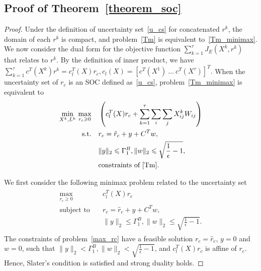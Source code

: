 \documentclass[10pt,twocolumn,twoside,english]{IEEEtran}
\begin{document}
\subsection{Proof of Theorem~\ref{theorem_soc}}
\label{appendix_soc}
\begin{proof}
Under the definition of uncertainty set~\eqref{u_cs} for concatenated $r^k$, the domain of each $r^k$ is compact, and problem~\eqref{Tm} is equivalent to~\eqref{Tm_minimax}. We now consider the dual form for the objective function $\sum\limits_{k=1}^{\tau}J_E(X^k, r^k)$ that relates to $r^k$. By the definition of inner product, we have
$\sum_{k=1}^{\tau}c^T(X^k) r^k = c^T_l (X) r_c,  c_l(X)=[c^T(X^1)\ \dots\ c^T(X^\tau)]^T.$
When the uncertainty set of $r_c$ is an SOC defined as~\eqref{u_cs}, problem~\eqref{Tm_minimax} is equivalent to
\begin{align}
\begin{split}
\underset{X^k, L^k}{\text{min}}\ \underset{r_c \geqslant 0}{\text{max}} \quad&\left(c_l^T(X) r_c + \sum_{k=1}^{\tau}\sum_{i} \sum_{j}X^k_{ij} W_{ij}\right)\\
\text{s.t.}\quad & r_c= \hat{r}_c +y+C^Tw,\\
                                     &\|y\|_2 \leqslant \Gamma_1^B, \|w\|_2 \leqslant \sqrt{\frac{1}{\epsilon}-1},\\
\quad&\text{constraints of~\eqref{Tm}.}
\end{split}
\label{max_rc}
\end{align}


We first consider the following minimax problem related to the uncertainty set 
\begin{align}
\begin{split}
\underset{r_c \geqslant 0}{\text{max}} \quad&c_l^T(X) r_c\\
\text{subject to}\quad & r_c= \hat{r}_c +y+C^Tw,\\
&\|y\|_2 \leqslant \Gamma_1^B, \|w\|_2 \leqslant \sqrt{\frac{1}{\epsilon}-1}.
\end{split}
\label{max_rc}
\end{align}
The constraints of problem~\eqref{max_rc} have a feasible solution $r_c=\hat{r}_c$, $y=0$ and $w=0$, such that $\|y\|_2 < \Gamma_1^B, \|w\|_2 < \sqrt{\frac{1}{\epsilon}-1}$, and $c_l^T(X) r_c$ is affine of $r_c$. Hence, Slater's condition is satisfied and strong duality holds.


\end{proof}
\end{document}
